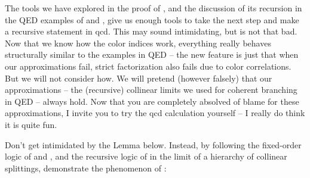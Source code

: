 


The tools we have explored in the proof of , and the discussion of its recursion in the QED examples of  and , give us enough tools to take the next step and make a recursive statement in \gls{qcd}.
%
This may sound intimidating, but is not that bad.
%
Now that we know how the color indices work, everything really behaves structurally similar to the examples in QED -- the new feature is just that when our approximations fail, strict factorization also fails due to color correlations.
%
But we will not consider how.
%
We will pretend (however falsely) that our approximations -- the (recursive) collinear limits we used for coherent branching in QED -- always hold.
%
Now that you are completely absolved of blame for these approximations, I invite you to try the \gls{qcd} calculation yourself -- I really do think it is quite fun.

\begin{exercise}
    \label{ex:qcd-coherent-branching-proof}
    Don't get intimidated by the Lemma below.
    Instead, by following the fixed-order logic of  and , and the recursive logic of  in the limit of a hierarchy of collinear splittings, demonstrate the phenomenon of :
\end{exercise}


